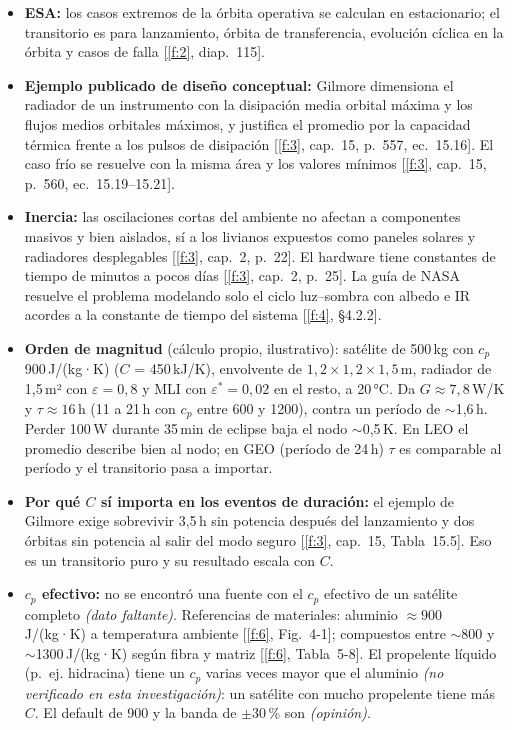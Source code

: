 \documentclass[11pt,a4paper]{article}
\newcommand{\op}[1]{\textcolor{opinion}{\textit{(#1)}}}
\newcommand{\f}[1]{\ref{f:#1}}
\begin{document}
\begin{itemize}
  \item \textbf{ESA:} los casos extremos de la órbita operativa se calculan en estacionario; el transitorio es para lanzamiento, órbita de transferencia, evolución cíclica en la órbita y casos de falla [\f{2}, diap.~115].
  \item \textbf{Ejemplo publicado de diseño conceptual:} Gilmore dimensiona el radiador de un instrumento con la disipación media orbital máxima y los flujos medios orbitales máximos, y justifica el promedio por la capacidad térmica frente a los pulsos de disipación [\f{3}, cap.~15, p.~557, ec.~15.16]. El caso frío se resuelve con la misma área y los valores mínimos [\f{3}, cap.~15, p.~560, ec.~15.19--15.21].
  \item \textbf{Inercia:} las oscilaciones cortas del ambiente no afectan a componentes masivos y bien aislados, sí a los livianos expuestos como paneles solares y radiadores desplegables [\f{3}, cap.~2, p.~22]. El hardware tiene constantes de tiempo de minutos a pocos días [\f{3}, cap.~2, p.~25]. La guía de NASA resuelve el problema modelando solo el ciclo luz--sombra con albedo e IR acordes a la constante de tiempo del sistema [\f{4}, §4.2.2].
  \item \textbf{Orden de magnitud} (cálculo propio, ilustrativo): satélite de 500\,kg con $c_p$ 900\,J/(kg·K) ($C$ = 450\,kJ/K), envolvente de $1{,}2 \times 1{,}2 \times 1{,}5$\,m, radiador de 1,5\,m² con $\varepsilon = 0{,}8$ y MLI con $\varepsilon^* = 0{,}02$ en el resto, a 20\,°C. Da $G \approx 7{,}8$\,W/K y $\tau \approx 16$\,h (11 a 21\,h con $c_p$ entre 600 y 1200), contra un período de $\sim$1,6\,h. Perder 100\,W durante 35\,min de eclipse baja el nodo $\sim$0,5\,K. En LEO el promedio describe bien al nodo; en GEO (período de 24\,h) $\tau$ es comparable al período y el transitorio pasa a importar.
  \item \textbf{Por qué $C$ sí importa en los eventos de duración:} el ejemplo de Gilmore exige sobrevivir 3,5\,h sin potencia después del lanzamiento y dos órbitas sin potencia al salir del modo seguro [\f{3}, cap.~15, Tabla~15.5]. Eso es un transitorio puro y su resultado escala con $C$.
  \item \textbf{$c_p$ efectivo:} no se encontró una fuente con el $c_p$ efectivo de un satélite completo \op{dato faltante}. Referencias de materiales: aluminio $\approx 900$\,J/(kg·K) a temperatura ambiente [\f{6}, Fig.~4-1]; compuestos entre $\sim$800 y $\sim$1300\,J/(kg·K) según fibra y matriz [\f{6}, Tabla~5-8]. El propelente líquido (p.~ej. hidracina) tiene un $c_p$ varias veces mayor que el aluminio \op{no verificado en esta investigación}: un satélite con mucho propelente tiene más $C$. El default de 900 y la banda de $\pm$30\,\% son \op{opinión}.
\end{itemize}
\end{document}
